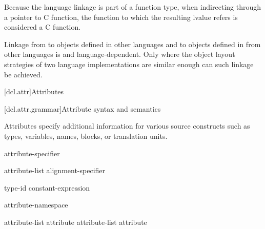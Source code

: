 \pnum
\begin{note}
Because the language linkage is part of a function type, when
indirecting through a pointer to C function, the function to
which the resulting lvalue refers is considered a C function.
\end{note}

\pnum
{}%
%
Linkage from \Cpp{} to objects defined in other languages and to objects
defined in \Cpp{} from other languages is  and
language-dependent. Only where the object layout strategies of two
language implementations are similar enough can such linkage be
achieved.%

[dcl.attr]{Attributes}%

[dcl.attr.grammar]{Attribute syntax and semantics}

\pnum
{}%
Attributes specify additional information for various source constructs
such as types, variables, names, blocks, or translation units.

\begin{bnf}
\br
   attribute-specifier
\end{bnf}

\begin{bnf}
\br
  \terminal{[} \terminal{[}  attribute-list \terminal{]} \terminal{]}\br
  alignment-specifier
\end{bnf}

\begin{bnf}
\br
   \terminal{(} type-id  \terminal{)}\br
   \terminal{(} constant-expression  \terminal{)}
\end{bnf}

\begin{bnf}
\br
   attribute-namespace \terminal{:}
\end{bnf}

\begin{bnf}
\br
  \br
  attribute-list \terminal{,} \br
  attribute \br
  attribute-list \terminal{,} attribute 
\end{bnf}

